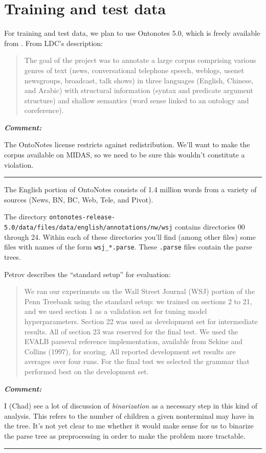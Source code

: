 \documentclass[english]{article}
\renewenvironment{comment}
    {%
     \par\medskip\noindent
     \tabularx{\textwidth}{|>{\columncolor[gray]{0.9}}X|}
     \hline
     \emph{\textbf{Comment:}}%
    }
    {%
     \endtabularx\hrule\par\medskip
    }
\begin{document}
\section{Training and test data}

For training and test data, we plan to use Ontonotes 5.0, which is freely available from \citet{LDC2013}. From LDC's description: 
\begin{quote}
The goal of the project was to annotate a large corpus comprising various genres of text (news, conversational telephone speech, weblogs, usenet newsgroups, broadcast, talk shows) in three languages (English, Chinese, and Arabic) with structural information (syntax and predicate argument structure) and shallow semantics (word sense linked to an ontology and coreference).
\end{quote}
\begin{comment}
The OntoNotes license restricts against redistribution. We'll want to make the corpus available on MIDAS, so we need to be sure this wouldn't constitute a violation.
\end{comment}


The English portion of OntoNotes consists of 1.4 million words from a variety of sources (News, BN, BC, Web, Tele, and Pivot).

The directory \texttt{ontonotes-release-5.0/data/files/data/english/annotations/nw/wsj} contains directories 00 through 24. Within each of these directories you'll find (among other files) some files with names of the form \texttt{wsj\_*.parse}. These \texttt{.parse} files contain the parse trees. 

Petrov describes the ``standard setup'' for evaluation:
\begin{quote}
We ran our experiments on the Wall Street Journal (WSJ) portion of the Penn Treebank using the standard setup: we trained on sections 2 to 21, and we used section 1 as a validation set for tuning model hyperparameters. Section 22 was used as development set for intermediate results. All of section 23 was reserved for the final test. We used the EVALB parseval reference implementation, available from Sekine and Collins (1997), for scoring. All reported development set results are averages over four runs. For the final test we selected the grammar that performed best on the development set.
\end{quote}
\begin{comment}
I (Chad) see a lot of discussion of \emph{binarization} as a necessary step in this kind of analysis. This refers to the number of children a given nonterminal may have in the tree. It's not yet clear to me whether it would make sense for us to binarize the parse tree as preprocessing in order to make the problem more tractable.
\end{comment}
\end{document}
